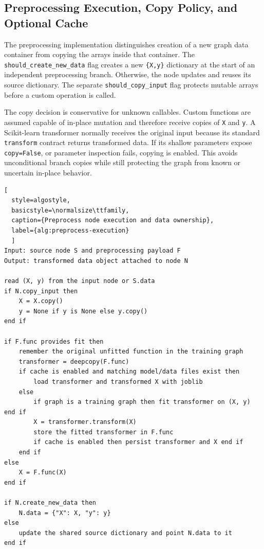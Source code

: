 \subsection{Preprocessing Execution, Copy Policy, and Optional Cache}

The preprocessing implementation distinguishes creation of a new graph data
container from copying the arrays inside that container. The
\texttt{should\_create\_new\_data} flag creates a new \texttt{\{X,y\}}
dictionary at the start of an independent preprocessing branch. Otherwise, the
node updates and reuses its source dictionary. The separate
\texttt{should\_copy\_input} flag protects mutable arrays before a custom
operation is called.

The copy decision is conservative for unknown callables. Custom functions are
assumed capable of in-place mutation and therefore receive copies of \texttt{X}
and \texttt{y}. A Scikit-learn transformer normally receives the original input
because its standard \texttt{transform} contract returns transformed data. If
its shallow parameters expose \texttt{copy=False}, or parameter inspection
fails, copying is enabled. This avoids unconditional branch copies while still
protecting the graph from known or uncertain in-place behavior.

\begin{lstlisting}[
  style=algostyle,
  basicstyle=\normalsize\ttfamily,
  caption={Preprocess node execution and data ownership},
  label={alg:preprocess-execution}
  ]
Input: source node S and preprocessing payload F
Output: transformed data object attached to node N

read (X, y) from the input node or S.data
if N.copy_input then
    X = X.copy()
    y = None if y is None else y.copy()
end if

if F.func provides fit then
    remember the original unfitted function in the training graph
    transformer = deepcopy(F.func)
    if cache is enabled and matching model/data files exist then
        load transformer and transformed X with joblib
    else
        if graph is a training graph then fit transformer on (X, y) end if
        X = transformer.transform(X)
        store the fitted transformer in F.func
        if cache is enabled then persist transformer and X end if
    end if
else
    X = F.func(X)
end if

if N.create_new_data then
    N.data = {"X": X, "y": y}
else
    update the shared source dictionary and point N.data to it
end if
\end{lstlisting}

